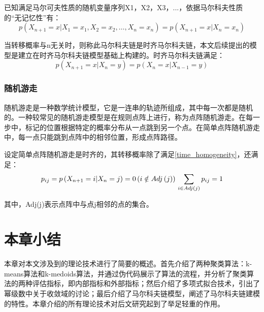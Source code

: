 已知满足马尔可夫性质的随机变量序列X1，X2，X3，...，依据马尔科夫性质的“无记忆性”有：
\begin{equation}
\label{markov_nature}
p\left(X_{n+1}=x | X_{1}=x_{1}, X_{2}=x_{2}, \ldots, X_{n}=x_{n}\right)=p\left(X_{n+1}=x | X_{n}=x_{n}\right)
\end{equation}

当转移概率与n无关时，则称此马尔科夫链是时齐马尔科夫链，本文后续提出的模型是建立在时齐马尔科夫链模型基础上构建的。时齐马尔科夫链满足：
\begin{equation}
\label{time_homogeneity}
p\left(X_{n+1}=x | X_{n}=y\right)=p\left(X_{n}=x | X_{n-1}=y\right)
\end{equation}

\subsubsection{随机游走}
随机游走是一种数学统计模型，它是一连串的轨迹所组成，其中每一次都是随机的。一种较常见的随机游走模型是在规则点阵上进行，称为点阵随机游走。在每一步中，标记的位置根据特定的概率分布从一点跳到另一个点。在简单点阵随机游走中，每一点只能跳到点阵中的相邻位置，形成点阵路径。

设定简单点阵随机游走是时齐的，其转移概率除了满足\ref{time_homogeneity}，还满足：
\begin{equation}
\label{random_walk}
p_{ij}=p\left( X_{n+1}=i|X_n=j \right) =0 \left( i\notin Adj\left( j \right) \right) 
\\
\sum_{i\in Adj\left( j \right)}{p_{ij}=1}
\end{equation}

其中，Adj(j)表示点阵中与点j相邻的点的集合。

\section{本章小结}

本章对本文涉及到的理论技术进行了简要的概述。首先介绍了两种聚类算法：k-means算法和k-medoids算法，并通过伪代码展示了算法的流程，并分析了聚类算法的两种评估指标，即内部指标和外部指标；然后介绍了多项式拟合技术，引出了幂级数中关于收敛域的讨论；最后介绍了马尔科夫链模型，阐述了马尔科夫链建模的特性。本章介绍的所有理论技术对后文研究起到了举足轻重的作用。